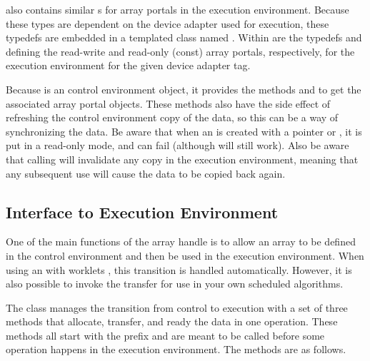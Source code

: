  also contains similar s for array
portals in the execution environment. Because these types are dependent on
the device adapter used for execution, these typedefs are embedded in a
templated class named . 
Within  are the typedefs  and
 defining the read-write and read-only (const) array
portals, respectively, for the execution environment for the given device
adapter tag.

Because  is an control environment object, it
provides the methods  
and   to get
the associated array portal objects. These methods also have the side
effect of refreshing the control environment copy of the data, so this can
be a way of synchronizing the data. Be aware that when an
 is created with a pointer or ,
it is put in a read-only mode, and  can fail
(although  will still work). Also be aware
that calling  will invalidate any copy in the
execution environment, meaning that any subsequent use will cause the data
to be copied back again.



\subsection{Interface to Execution Environment}
\label{sec:ArrayHandleInterfaceToExecutionEnvironment}

One of the main functions of the array handle is to allow an array to be
defined in the control environment and then be used in the execution
environment. When using an  with worklets
, this transition is handled automatically. However, it is
also possible to invoke the transfer for use in your own scheduled
algorithms.

The  class manages the transition from control
to execution with a set of three methods that allocate, transfer, and ready
the data in one operation. These methods all start with the prefix
 and are meant to be called before some operation happens
in the execution environment. The methods are as follows.

